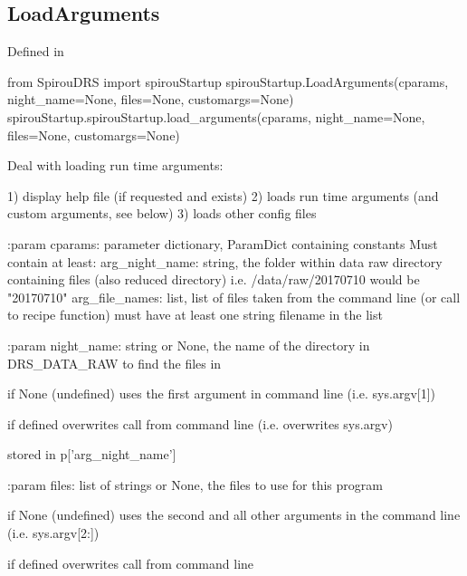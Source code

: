 \noindent\begin{minipage}{\textwidth}
\subsection{LoadArguments}

Defined in \spirouStartup{}

\begin{pythonbox}
from SpirouDRS import spirouStartup
spirouStartup.LoadArguments(cparams, night_name=None, files=None, customargs=None)
spirouStartup.spirouStartup.load_arguments(cparams, night_name=None, files=None, customargs=None)
\end{pythonbox}

\begin{pythondocstring}
Deal with loading run time arguments:

1) display help file (if requested and exists)
2) loads run time arguments (and custom arguments, see below)
3) loads other config files

:param cparams: parameter dictionary, ParamDict containing constants
    Must contain at least:
            arg_night_name: string, the folder within data raw directory
                            containing files (also reduced directory) i.e.
                            /data/raw/20170710 would be "20170710"
            arg_file_names: list, list of files taken from the command line
                            (or call to recipe function) must have at least
                            one string filename in the list

:param night_name: string or None, the name of the directory in DRS_DATA_RAW
                   to find the files in

                   if None (undefined) uses the first argument in command
                   line (i.e. sys.argv[1])

                   if defined overwrites call from
                   command line (i.e. overwrites sys.argv)

                   stored in p['arg_night_name']

:param files: list of strings or None, the files to use for this program

              if None (undefined) uses the second and all other arguments in
              the command line (i.e. sys.argv[2:])

              if defined overwrites call from command line


\end{pythondocstring}
\end{minipage}
